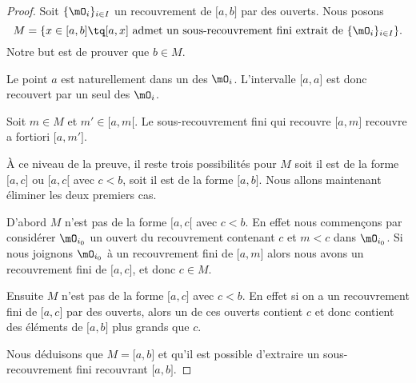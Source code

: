 \begin{proof}
    Soit \( \{ \mO_i \}_{i\in I}\) un recouvrement de \( \mathopen[ a , b \mathclose]\) par des ouverts. Nous posons
    \begin{equation}
        M=\{ x\in\mathopen[ a , b \mathclose]\tq \mathopen[ a , x \mathclose] \text{ admet un sous-recouvrement fini extrait de \( \{ \mO_i \}_{i\in I}\)} \}.
    \end{equation}
    Notre but est de prouver que \( b\in M\).
    \begin{subproof}

    \item[\( a\) est dans \( M\)]

        Le point \( a\) est naturellement dans un des \( \mO_i\). L'intervalle \( \mathopen[ a , a \mathclose]\) est donc recouvert par un seul des \( \mO_i\).

    \item[\( M\) est un intervalle]

        Soit \( m\in M\) et \( m'\in\mathopen[ a , m [\). Le sous-recouvrement fini qui recouvre \( \mathopen[ a , m \mathclose]\) recouvre a fortiori \( \mathopen[ a , m' \mathclose]\).

    \item[Les trois possibilités restantes]
        À ce niveau de la preuve, il reste trois possibilités pour \( M\) soit il est de la forme \( \mathopen[ a , c \mathclose]\) ou \( \mathopen[ a , c [\) avec \( c<b\), soit il est de la forme \( \mathopen[ a , b \mathclose]\). Nous allons maintenant éliminer les deux premiers cas.

    \item[Ce que \( M\) n'est pas]

        D'abord \( M\) n'est pas de la forme \( \mathopen[ a , c [\) avec \( c<b\). En effet nous commençons par considérer \( \mO_{i_0}\) un ouvert du recouvrement contenant \( c\) et \( m<c\) dans \( \mO_{i_0}\). Si nous joignons \( \mO_{i_0}\) à un recouvrement fini de \( \mathopen[ a , m \mathclose]\) alors nous avons un recouvrement fini de \( \mathopen[ a , c \mathclose]\), et donc \( c\in M\).

        Ensuite \( M\) n'est pas de la forme \( \mathopen[ a , c \mathclose]\) avec \( c<b\). En effet si on a un recouvrement fini de \( \mathopen[ a , c \mathclose]\) par des ouverts, alors un de ces ouverts contient \( c\) et donc contient des éléments de \( \mathopen[ a , b \mathclose]\) plus grands que \( c\).
    \end{subproof}
    Nous déduisons que \( M=\mathopen[ a , b \mathclose]\) et qu'il est possible d'extraire un sous-recouvrement fini recouvrant \( \mathopen[ a , b \mathclose]\).
\end{proof}

